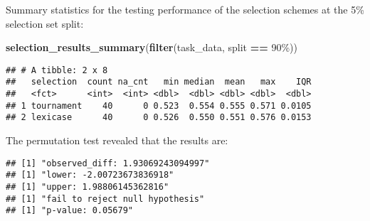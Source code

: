 \documentclass[
]{book}
\newenvironment{Shaded}{\begin{snugshade}}{\end{snugshade}}
\newcommand{\AttributeTok}[1]{\textcolor[rgb]{0.13,0.29,0.53}{#1}}
\newcommand{\DecValTok}[1]{\textcolor[rgb]{0.00,0.00,0.81}{#1}}
\newcommand{\FunctionTok}[1]{\textcolor[rgb]{0.13,0.29,0.53}{\textbf{#1}}}
\newcommand{\NormalTok}[1]{#1}
\newcommand{\OtherTok}[1]{\textcolor[rgb]{0.56,0.35,0.01}{#1}}
\newcommand{\SpecialCharTok}[1]{\textcolor[rgb]{0.81,0.36,0.00}{\textbf{#1}}}
\newcommand{\StringTok}[1]{\textcolor[rgb]{0.31,0.60,0.02}{#1}}
\begin{document}
Summary statistics for the testing performance of the selection schemes at the 5\% selection set split:

\begin{Shaded}
\begin{Highlighting}[]
\FunctionTok{selection\_results\_summary}\NormalTok{(}\FunctionTok{filter}\NormalTok{(task\_data, split }\SpecialCharTok{==} \StringTok{\textquotesingle{}90\%\textquotesingle{}}\NormalTok{))}
\end{Highlighting}
\end{Shaded}

\begin{verbatim}
## # A tibble: 2 x 8
##   selection  count na_cnt   min median  mean   max    IQR
##   <fct>      <int>  <int> <dbl>  <dbl> <dbl> <dbl>  <dbl>
## 1 tournament    40      0 0.523  0.554 0.555 0.571 0.0105
## 2 lexicase      40      0 0.526  0.550 0.551 0.576 0.0153
\end{verbatim}

The permutation test revealed that the results are:

\begin{Shaded}
\end{Shaded}

\begin{verbatim}
## [1] "observed_diff: 1.93069243094997"
## [1] "lower: -2.00723673836918"
## [1] "upper: 1.98806145362816"
## [1] "fail to reject null hypothesis"
## [1] "p-value: 0.05679"
\end{verbatim}
\end{document}
